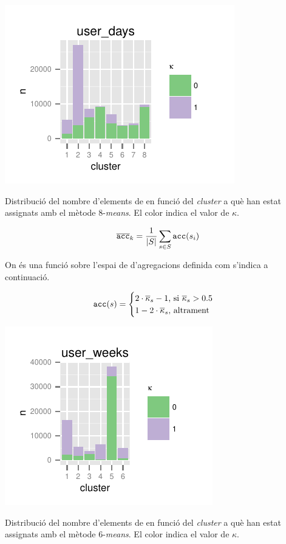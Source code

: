 \documentclass[
	a4paper,
	twoside,
	justified
]{tufte-book}
\begin{document}
\begin{marginfigure}
\begin{center}
\includegraphics{user_presence_pred8means_clusts}
\caption{
\label{graph:user_presence_pred8means_clusts}
	Distribució del nombre d'elements de  en funció del \emph{cluster} a què han estat assignats amb el mètode 8-\emph{means}. El color indica el valor de $\kappa$.
}
\end{center}
\end{marginfigure}

$$
	\overline{\texttt{acc}}_k = \frac{1}{|S|} \sum_{s \in S} \texttt{acc}(s_i)
$$  

On  és una funció sobre l'espai de d'agregacions definida com s'indica a continuació.

$$
	\texttt{acc}(s) = \begin{cases}
									 2 \cdot \overline{\kappa}_s - 1   
									 	\text{, si } \overline{\kappa}_s > 0.5 \\
									1 - 2 \cdot \overline{\kappa}_s\text{, altrament}\\
									\end{cases}
$$

\begin{marginfigure}
\begin{center}
\includegraphics{week_user_presence_pred6means_clusts}
\caption{
\label{graph:week_user_presence_pred6means_clusts}
	Distribució del nombre d'elements de  en funció del \emph{cluster} a què han estat assignats amb el mètode 6-\emph{means}. El color indica el valor de $\kappa$.
}
\end{center}
\end{marginfigure} 
\end{document}
